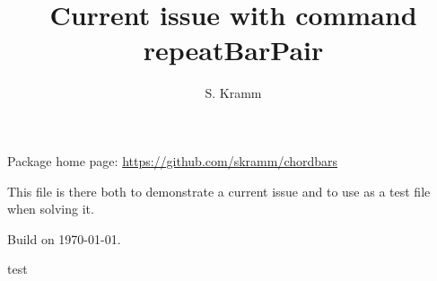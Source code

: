 \documentclass[12pt]{article}
\title{Current issue with command repeatBarPair}
\author{S. Kramm}
\begin{document}
\countbarsNo

\songtitle

Package home page: \url{https://github.com/skramm/chordbars}


This file is there both to demonstrate a current issue and to use as a test file when solving it.



Build on \today.


\def\barsize{1.5}%

\def\chordFontSize{\large\bfseries}
\begin{chordbar}{6}{test}
\repeatBarPair
\end{chordbar}
\end{document}

